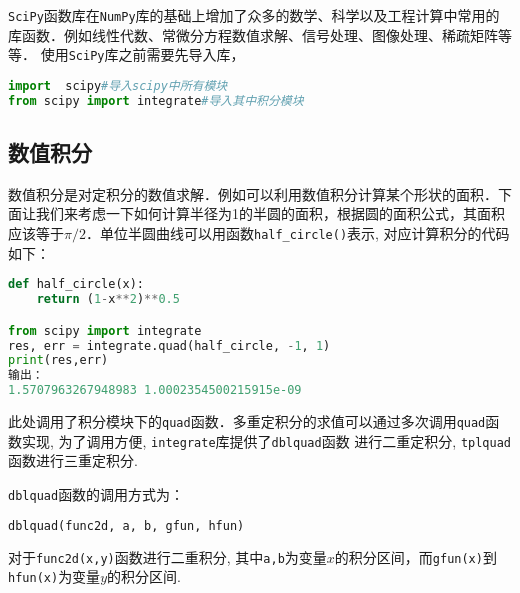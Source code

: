 \verb|SciPy|函数库在\verb|NumPy|库的基础上增加了众多的数学、科学以及工程计算中常用的库函数．例如线性代数、常微分方程数值求解、信号处理、图像处理、稀疏矩阵等等．
使用\verb|SciPy|库之前需要先导入库，
\begin{lstlisting}[language=python]
import  scipy#导入scipy中所有模块
from scipy import integrate#导入其中积分模块
\end{lstlisting}
\subsection{数值积分}
数值积分是对定积分的数值求解．例如可以利用数值积分计算某个形状的面积．下面让我们来考虑一下如何计算半径为1的半圆的面积，根据圆的面积公式，其面积应该等于$\pi/2$．单位半圆曲线可以用函数\verb|half_circle()|表示, 对应计算积分的代码如下：
\begin{lstlisting}[language=python]
def half_circle(x):
    return (1-x**2)**0.5

from scipy import integrate
res, err = integrate.quad(half_circle, -1, 1)
print(res,err)
输出：
1.5707963267948983 1.0002354500215915e-09
\end{lstlisting}
此处调用了积分模块下的\verb|quad|函数．多重定积分的求值可以通过多次调用\verb|quad|函数实现, 为了调用方便, \verb|integrate|库提供了\verb|dblquad|函数
进行二重定积分, \verb|tplquad|函数进行三重定积分.

\verb|dblquad|函数的调用方式为：
\begin{lstlisting}[language=python]
dblquad(func2d, a, b, gfun, hfun)
\end{lstlisting}
对于\verb|func2d(x,y)|函数进行二重积分, 其中\verb|a,b|为变量$x$的积分区间，而\verb|gfun(x)|到\verb|hfun(x)|为变量$y$的积分区间.
